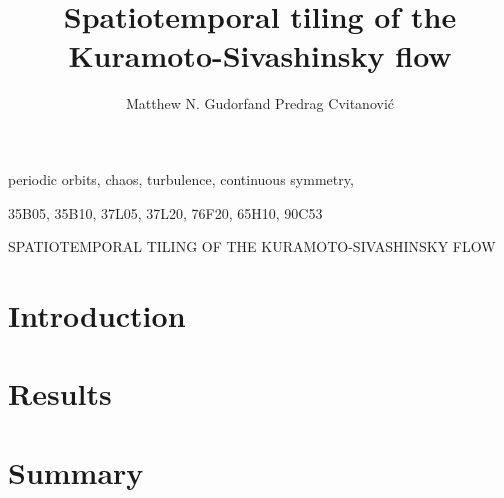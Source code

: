 \documentclass{siamonline181217}          %
\begin{document}
                \title{
Spatiotemporal tiling of the Kuramoto-Sivashinsky flow
                 }
                  \author{
Matthew N. Gudorf\footnotemark[1]
    and
Predrag Cvitanovi\'c\footnotemark[1]
                    }

                \maketitle

\renewcommand{\thefootnote}{\fnsymbol{footnote}}
\renewcommand{\thefootnote}{\arabic{footnote}}

                \begin{abstract}

                \end{abstract}

\begin{keywords}
periodic orbits, chaos, turbulence, continuous symmetry, {\KSe}
\end{keywords}

\begin{AMS}
35B05, 35B10, 37L05, 37L20, 76F20, 65H10, 90C53
\end{AMS}

\pagestyle{myheadings}
\thispagestyle{plain}
         {SPATIOTEMPORAL TILING OF THE KURAMOTO-SIVASHINSKY FLOW}

    \section{Introduction}
    \label{sect:intro}
    

    \section{Results}
    \label{sect:body}
\Preliminary{
\newpage}
    
\Preliminary{\newpage
\newpage}

    \section{Summary}
    \label{sect:summary}
    
    


\ifdraft
    \newpage
    {\color{blue}

    }
\fi
\end{document}
